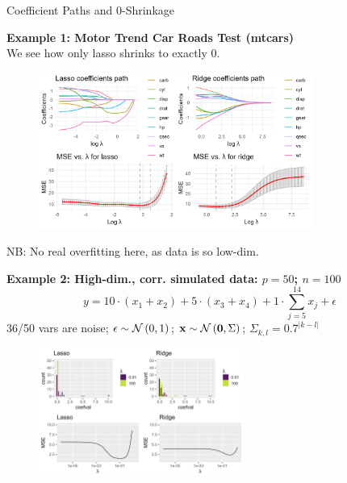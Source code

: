 \documentclass[11pt,compress,t,notes=noshow, xcolor=table]{beamer}
\begin{document}
\begin{vbframe}{Coefficient Paths and 0-Shrinkage}

\textbf{Example 1: Motor Trend Car Roads Test (mtcars)} \\

We see how only lasso shrinks to exactly 0.

\begin{figure}
\includegraphics[width=0.8\textwidth]{figure/l1_l2_regupaths_mse.png}\\
\end{figure}
\vspace{-0.3cm}
NB: No real overfitting here, as data is so low-dim.

\framebreak
\textbf{Example 2: High-dim., corr. simulated data: $p=50$; $n=100$}
$$ y = 10 \cdot (x_1 + x_2) + 5 \cdot (x_3 + x_4) + 1 \cdot \sum_{j = 5}^{14} x_j + \epsilon $$
36/50 vars are noise; $\epsilon \sim \mathcal{N} \left(0, 1\right)$; $\mathbf{x} \sim \mathcal{N} \left(\mathbf{0}, \Sigma \right)$; 
$\Sigma_{k,l}=0.7^{|k-l|}$ 



\begin{figure}
\includegraphics[width=0.6\textwidth]{figure/shrinkage_02.png}\\
\end{figure}

\end{vbframe}
\end{document}
